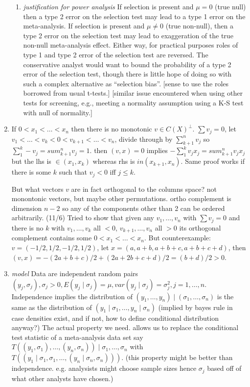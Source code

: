 \documentclass{article}
\begin{document}
\begin{enumerate}
\begin{enumerate}
\item \emph{justification for power analysis} If selection is present
  and $\mu=0$ (true null) then a type 2 error on the selection test
  may lead to a type 1 error on the meta-analysis. If selection is
  present and $\mu\neq 0$ (true non-null), then a type 2 error on the
  selection test may lead to exaggeration of the true non-null
  meta-analysis effect. Either way, for practical purposes roles of
  type 1 and type 2 error of the selection test are reversed. The
  conservative analyst would want to bound the probability of a type 2
  error of the selection test, though there is little hope of doing so
  with such a complex alternative as ``selection bias''.  [sense to
  use the roles borrowed from usual t-tests.]  [similar issue
  encountered when using other tests for screening, e.g., meeting a
  normality assumption using a K-S test with null of normality.]
  \end{enumerate}

\item If $0<x_1<\ldots<x_n$ then there is no monotonic $v\in
  C(X)^{\perp}$. $\sum v_j=0$, let
  $v_1<\ldots<v_k<0<v_{k+1}<\ldots<v_n$, divide through by
  $\sum_{k+1}^nv_j$ so $\sum_1^k-v_j=sum_{k+1}^nv_j=1$. then $(v,x)=0$
  implies $-\sum_1^kv_jx_j=sum_{k+1}^nv_jx_j$ but the lhs is $\in
  (x_1,x_k)$ whereas rhs is $in (x_{k+1},x_n)$. Same proof works if
  there is some $k$ such that $v_j<0$ iff $j\le k$.

  But what vectors $v$ are in fact orthogonal to the columns space? not
  monontonic vectors, but maybe other permutations. ortho complement is
  dimension $n-2$ so any of the components other than 2 can be ordered
  arbitrarily. (11/6) Tried to show that given any $v_1,\ldots,v_n$ with
  $\sum v_j=0$ and there is no $k$ with $v_1,\ldots,v_k$ all $<0$,
  $v_{k+1},\ldots,v_n$ all $>0$ its orthogonal complement contains some
  $0<x_1<\ldots<x_n$. But counterexample: $v=(-1/2,1/2,-1/2,1/2)$, let
  $x=(a,a+b,a+b+c,a+b+c+d)$, then
  $(v,x)=-(2a+b+c)/2 + (2a+2b+c+d)/2=(b+d)/2>0$.



\item \emph{model} 
  Data are independent random pairs
  $(y_j,\sigma_j),\sigma_j>0,E(y_j\mid\sigma_j)=\mu,
  var(y_j\mid\sigma_j)=\sigma_j^2, j=1,\ldots,n$. Independence implies
  the distribution of $(y_1,\ldots,y_n)\mid (\sigma_1,\ldots,\sigma_n)$
  is the same as the distribution of
  $(y_1\mid\sigma_1,\ldots,y_n\mid\sigma_n)$ (implied by bayes rule in
  case densities exist, and if not, how to define conditional
  distribution anyway?) The actual property we need. allows us to
  replace the conditional test statistic of a meta-analysis data set say
  $T((y_1,\sigma_1),\ldots,(y_n,\sigma_n))\mid\sigma_1,\ldots,\sigma_n$
  with
  $T((y_1\mid\sigma_1,\sigma_1,\ldots,(y_n\mid\sigma_n,\sigma_n)))$. (this
  property might be better than independence. e.g. analysists might
  choose sample sizes hence $\sigma_j$ based off of what other analysts
  have chosen.)


\end{enumerate}
\end{document}
